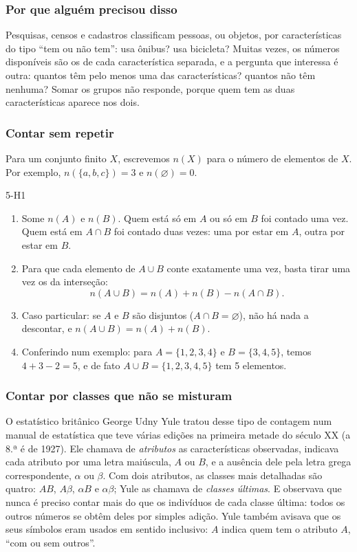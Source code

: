\DeOndeVem

\subsubsection{Por que alguém precisou disso}
Pesquisas, censos e cadastros classificam pessoas, ou objetos, por características do tipo \enquote{tem ou não tem}: usa ônibus? usa bicicleta? Muitas vezes, os números disponíveis são os de cada característica separada, e a pergunta que interessa é outra: quantos têm pelo menos uma das características? quantos não têm nenhuma? Somar os grupos não responde, porque quem tem as duas características aparece nos dois.

\subsubsection{Contar sem repetir}
Para um conjunto finito $X$, escrevemos $n(X)$ para o número de elementos de $X$. Por exemplo, $n(\{a,b,c\})=3$ e $n(\varnothing)=0$.

\begin{construcao}{5-H1}
\begin{enumerate}[label=(\arabic*)]
  \item Some $n(A)$ e $n(B)$. Quem está só em $A$ ou só em $B$ foi contado uma vez. Quem está em $A\cap B$ foi contado duas vezes: uma por estar em $A$, outra por estar em $B$.
  \item Para que cada elemento de $A\cup B$ conte exatamente uma vez, basta tirar uma vez os da interseção:
\[
n(A\cup B)=n(A)+n(B)-n(A\cap B).
\]
  \item Caso particular: se $A$ e $B$ são disjuntos ($A\cap B=\varnothing$), não há nada a descontar, e $n(A\cup B)=n(A)+n(B)$.
  \item Conferindo num exemplo: para $A=\{1,2,3,4\}$ e $B=\{3,4,5\}$, temos $4+3-2=5$, e de fato $A\cup B=\{1,2,3,4,5\}$ tem 5 elementos.
\end{enumerate}
\end{construcao}

\subsubsection{Contar por classes que não se misturam}
O estatístico britânico George Udny Yule tratou desse tipo de contagem num manual de estatística que teve várias edições na primeira metade do século XX (a 8.ª é de 1927). Ele chamava de \emph{atributos} as características observadas, indicava cada atributo por uma letra maiúscula, $A$ ou $B$, e a ausência dele pela letra grega correspondente, $\alpha$ ou $\beta$. Com dois atributos, as classes mais detalhadas são quatro: $AB$, $A\beta$, $\alpha B$ e $\alpha\beta$; Yule as chamava de \emph{classes últimas}. E observava que nunca é preciso contar mais do que os indivíduos de cada classe última: todos os outros números se obtêm deles por simples adição. Yule também avisava que os seus símbolos eram usados em sentido inclusivo: $A$ indica quem tem o atributo $A$, \enquote{com ou sem outros}.

